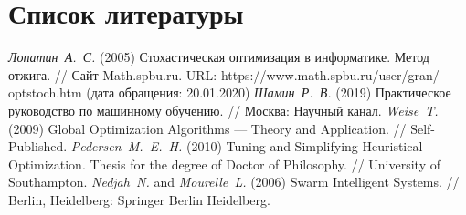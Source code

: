 \clearpage                                  %


\chapter*{Список литературы}


\begin{thebibliography}{7}
	 \textit{Лопатин\ А.\ С.} (2005) Стохастическая оптимизация
в информатике. Метод отжига. // Сайт Math.spbu.ru. URL: https://www.math.spbu.ru/user/gran/\\optstoch.htm (дата обращения: 20.01.2020)
	 \textit{Шамин\ Р.\ В.} (2019) Практическое руководство по машинному обучению. // Москва: Научный канал.
	 \textit{Weise\ T.} (2009) Global Optimization Algorithms --- Theory and
Application. // Self-Published.
	 \textit{Pedersen\ M.\ E.\ H.} (2010) Tuning and Simplifying Heuristical Optimization. Thesis for the degree of Doctor of Philosophy. // University of Southampton.
	 \textit{Nedjah\ N.} and \textit{Mourelle\ L.} (2006) Swarm Intelligent Systems. // Berlin, Heidelberg: Springer Berlin Heidelberg.
\end{thebibliography}
